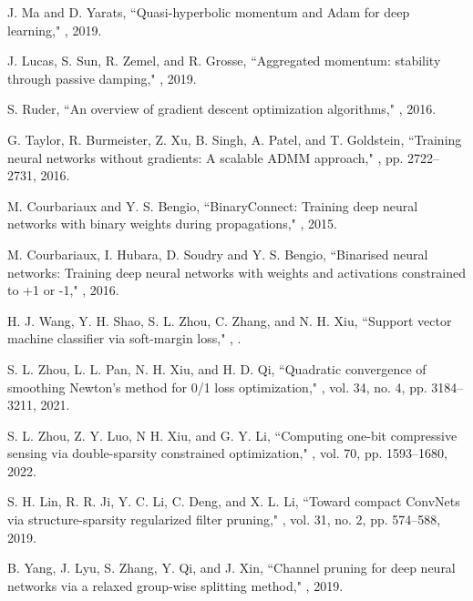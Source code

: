 \documentclass[journal]{IEEEtran}
\begin{document}
\begin{thebibliography}{99}
 J. Ma and D. Yarats,
  \newblock  ``Quasi-hyperbolic momentum and Adam for deep learning,"
 , 2019.


J. Lucas,  S. Sun,   R. Zemel, and R. Grosse,
 \newblock  ``Aggregated momentum: stability through passive damping,"
, 2019.


S. Ruder,
\newblock  ``An overview of gradient descent optimization algorithms,"
, 2016.


G. Taylor, R. Burmeister, Z. Xu, B. Singh, A. Patel, and T. Goldstein,
\newblock  ``Training neural networks without gradients: A scalable ADMM approach,"
,
 pp. 2722--2731, 2016.


M. Courbariaux and Y. S. Bengio,
\newblock  ``BinaryConnect: Training deep neural networks with binary weights during propagations,"
, 2015.


M. Courbariaux, I. Hubara, D. Soudry and Y. S. Bengio,
\newblock  ``Binarised neural networks: Training deep neural networks with weights and activations
constrained to +1 or -1,"
, 2016.





H. J. Wang, Y. H. Shao, S. L. Zhou, C. Zhang, and N. H. Xiu,
\newblock  ``Support vector machine classifier via  soft-margin loss,"
,
.


S. L. Zhou, L. L. Pan, N. H. Xiu, and H. D. Qi,
\newblock  ``Quadratic convergence of smoothing Newton's method for 0/1 loss optimization,"
,
\newblock vol. 34, no. 4, pp. 3184--3211, 2021.


S. L. Zhou, Z. Y. Luo, N H. Xiu, and G. Y. Li,
\newblock  ``Computing one-bit compressive sensing via double-sparsity constrained optimization,"
,
\newblock vol. 70, pp. 1593--1680, 2022.


S. H. Lin, R. R. Ji, Y. C. Li, C. Deng, and X. L. Li,
\newblock  ``Toward compact ConvNets via structure-sparsity regularized filter pruning,"
,
\newblock vol. 31, no. 2, pp. 574--588, 2019.


B. Yang, J. Lyu, S. Zhang, Y. Qi, and J. Xin,
\newblock  ``Channel pruning for deep neural networks via a relaxed group-wise splitting method,"
, 2019.



\end{thebibliography}
\end{document}
